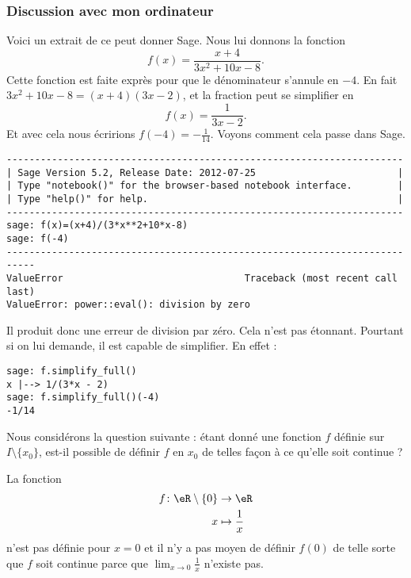 \subsubsection{Discussion avec mon ordinateur}

Voici un extrait de ce peut donner Sage. Nous lui donnons la fonction
\begin{equation}    \label{EqyEHTBZ}
	f(x)=\frac{ x+4 }{ 3x^2+10x-8 }.
\end{equation}
Cette fonction est faite exprès pour que le dénominateur s'annule en \( -4\). En fait \( 3x^2+10x-8=(x+4)(3x-2)\), et la fraction peut se simplifier en
\begin{equation}
	f(x)=\frac{1}{ 3x-2 }.
\end{equation}
Et avec cela nous écririons \( f(-4)=-\frac{1}{ 14 }\). Voyons comment cela passe dans Sage.

\begin{verbatim}
----------------------------------------------------------------------
| Sage Version 5.2, Release Date: 2012-07-25                         |
| Type "notebook()" for the browser-based notebook interface.        |
| Type "help()" for help.                                            |
----------------------------------------------------------------------
sage: f(x)=(x+4)/(3*x**2+10*x-8)
sage: f(-4)
---------------------------------------------------------------------------
ValueError                                Traceback (most recent call last)
ValueError: power::eval(): division by zero
\end{verbatim}
Il produit donc une erreur de division par zéro. Cela n'est pas étonnant. Pourtant si on lui demande, il est capable de simplifier. En effet :
\begin{verbatim}
sage: f.simplify_full()
x |--> 1/(3*x - 2)
sage: f.simplify_full()(-4)
-1/14
\end{verbatim}

Nous considérons la question suivante : étant donné une fonction \( f\) définie sur \( I\setminus\{ x_0 \}\), est-il possible de définir \( f\) en \( x_0\) de telles façon à ce qu'elle soit continue ?

\begin{example}
	La fonction
	\begin{equation}
		\begin{aligned}
			f\colon \eR\setminus\{ 0 \} & \to \eR               \\
			x                           & \mapsto \frac{1}{ x }
		\end{aligned}
	\end{equation}
	n'est pas définie pour \( x=0\) et il n'y a pas moyen de définir \( f(0)\) de telle sorte que \( f\) soit continue parce que \( \lim_{x\to 0} \frac{1}{ x }\) n'existe pas.
\end{example}

